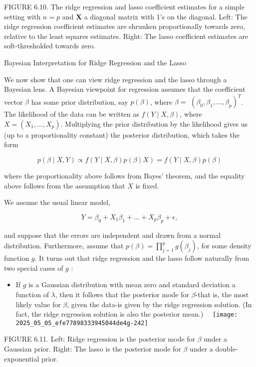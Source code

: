 \documentclass[10pt]{article}
\begin{document}
FIGURE 6.10. The ridge regression and lasso coefficient estimates for a simple setting with $n=p$ and $\mathbf{X}$ a diagonal matrix with 1's on the diagonal. Left: The ridge regression coefficient estimates are shrunken proportionally towards zero, relative to the least squares estimates. Right: The lasso coefficient estimates are soft-thresholded towards zero.

Bayesian Interpretation for Ridge Regression and the Lasso

We now show that one can view ridge regression and the lasso through a Bayesian lens. A Bayesian viewpoint for regression assumes that the coefficient vector $\beta$ has some prior distribution, say $p(\beta)$, where $\beta=$ $\left(\beta_{0}, \beta_{1}, \ldots, \beta_{p}\right)^{T}$. The likelihood of the data can be written as $f(Y \mid X, \beta)$, where $X=\left(X_{1}, \ldots, X_{p}\right)$. Multiplying the prior distribution by the likelihood gives us (up to a proportionality constant) the posterior distribution, which takes the form

$$
p(\beta \mid X, Y) \propto f(Y \mid X, \beta) p(\beta \mid X)=f(Y \mid X, \beta) p(\beta)
$$

where the proportionality above follows from Bayes' theorem, and the equality above follows from the assumption that $X$ is fixed.

We assume the usual linear model,

$$
Y=\beta_{0}+X_{1} \beta_{1}+\ldots+X_{p} \beta_{p}+\epsilon,
$$

and suppose that the errors are independent and drawn from a normal distribution. Furthermore, assume that $p(\beta)=\prod_{j=1}^{p} g\left(\beta_{j}\right)$, for some density function $g$. It turns out that ridge regression and the lasso follow naturally from two special cases of $g$ :

\begin{itemize}
  \item If $g$ is a Gaussian distribution with mean zero and standard deviation a function of $\lambda$, then it follows that the posterior mode for $\beta$-that is, the most likely value for $\beta$, given the data-is given by the ridge regression solution. (In fact, the ridge regression solution is also the posterior mean.)\
\
\texttt{[image: 2025\_05\_05\_efe77898333945044de4g-242]}
\end{itemize}

FIGURE 6.11. Left: Ridge regression is the posterior mode for $\beta$ under a Gaussian prior. Right: The lasso is the posterior mode for $\beta$ under a double-exponential prior.
\end{document}
